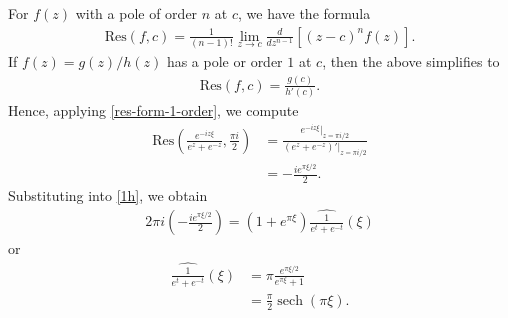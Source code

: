 \documentclass[12pt,reqno]{amsart}
\numberwithin{equation}{section}  %
\newcommand{\wh}{\widehat}
\DeclareMathOperator{\sech}{sech}
\begin{document}
        For $f(z)$ with a pole of order $n$ at $c$, we have the formula
        \begin{equation}
          \label{res-form}
        \begin{split}
          \text{Res}(f, c) =  \frac{1}{(n-1)!} \lim_{z \to c}
          \frac{d}{dz^{n-1}} \left[ (z-c)^{n} f(z) \right].
        \end{split}
        \end{equation}
        If $f(z) = g(z)/h(z)$ has a pole or order $1$ at $c$, then the above
        simplifies to
        \begin{equation}
          \label{res-form-1-order}
        \begin{split}
          \text{Res}(f,c) = \frac{g(c)}{h'(c)}.
        \end{split}
        \end{equation}
        Hence, applying \eqref{res-form-1-order}, we compute
        \begin{equation*}
        \begin{split}
          \text{Res} \left( \frac{ e^{-iz \xi}}{e^{z} + e^{-z}},
          \frac{\pi i}{2} \right)
          & = \frac{e^{-iz \xi} \vert_{z = \pi i/2}}{(e^{z} + e^{-z})'
          \vert_{z = \pi i/2}}
          \\
          & = - \frac{i e^{ \pi \xi/2}}{2}.
        \end{split}
        \end{equation*}
        Substituting into \eqref{1h}, we obtain
        \begin{equation*}
        \begin{split}
          2 \pi i \left( - \frac{ie^{ \pi \xi/2}}{2} \right) =  (1 +
          e^{ \pi \xi}) \wh{\frac{1}{e^{t} + e^{-t}}}(\xi)
        \end{split}
        \end{equation*}
        or
        \begin{equation*}
        \begin{split}
          \wh{\frac{1}{e^{t} + e^{-t}}}(\xi) 
          & =
           \pi \frac{e^{ \pi \xi /2}}{e^{ \pi \xi} + 1}
          \\
          & = \frac{ \pi}{2}  \sech(\pi \xi).
        \end{split}
        \end{equation*}
\end{document}
